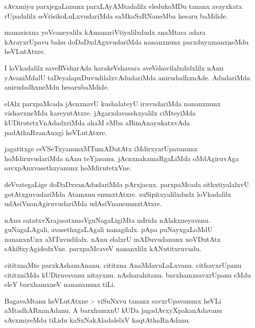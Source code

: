 \documentclass{article}
\begin{document}
\begin{mn}
sAvxmiyu parxjegaLanunx parxLAyAMtadalilx  eledukoMDu tananx avayxkatx 
rUpadalilx seVrisikoLuLxvudariMda saMkaSaRNaneMba hesaru baMdide.
\end{mn}

\begin{mn}
manasisxna yoVcaneyalilx kAmanariVtiyalilxdudx anaMtara adara kArayxrUpavu 
bahu doDaDxdAguvudariMda nananxnunx parxduyxmanxneMdu heVLutAtxre. 
\end{mn}

\begin{mn}
I loVkadalilx saveRVsharAda harakeVshavara  aveVshavilalxdidxlilx nAnu 
yAvaniMdalU taDeyalapxDuvudilalxvAdudariMda anirudadhxnAde.
 AdudariMda anirudadhxneMdu hesarubaMdide.
\end{mn}

\begin{mn}
elAlx parxpaMcada jAcnxnavU kushalateyU iruvudariMda nananxnunx vishavxneMdu 
kareyutAtxre.  jAgarxdavasehxyalilx ciMteyiMda kUDirutetxVnAdadxriMda ahaM 
eMba aBimAnayukatxvAda padAthaRvanAnxgi heVLutAtxre.
\end{mn}

\begin{mn}
jagatitxge  ceVSeTxyanunxMTumADutAtx  iMdirxyarUpavanunx hoMdiruvudariMda nAnu 
teYjasanu.  jAcnxnakamaRgaLiMda oMdAgiruvAga savxpAnxvasethxyanunx hoMdirutetxVne.
\end{mn}

\begin{mn}
deVvategaLige doDaDxvanAdudariMda   pArxjacnx.  parxpaMcada sithxtiyalalxvU 
gotAtxguvudariMda Atamxnu enunxtAtxre.  suSipitxyalilxdudx loVkadalilx  
udAsiVnanAgiruvudariMda udAsiVnanenunxtAtxre.
\end{mn}

\begin{mn}
nAnu satatxvXrajasatxmoVguNagaLigiMta mIrida nAlakxneyavanu. guNagaLAgali, 
avasethxgaLAgali nanagilalx.  pApa puNayxgaLoMdU nananxnUnx aMTuvudilalx.  nAnu elalxrU 
mADuvudanunx  noVDutAtx  sAkiSxyAgidedxVne. parxpaMcaveV nananxlilx kANutitxruvudu.
\end{mn}

\begin{mn}
cititxnaMte parxkAshamAnanu.  cititxna AnaMdavuLaLxvanu.  citfsavxrUpanu 
cititxniMda  kUDiruvavanu nitayxnu.  nAsharahitanu.  barxhamxsavxrUpanu 
eMdu eleY barxhamxneV nananxnunx tiLi.
\end{mn}

\begin{mn}
BagavaMtanu heVLutAtxne :- viSuNxvu tananx savxrUpavanunx heVLi aMtadhARnanAdanu.  
A barxhamxnU kUDa  jagadAvxyXpakanAdavanu  sAvxmiyeMdu  tiLidu kaSxNakAladalelxV kaqtAthaRnAdanu.
\end{mn}
\end{document}
